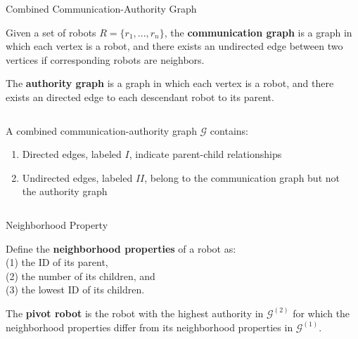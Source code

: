 \documentclass[10pt]{beamer}
\newcommand{\G}{\mathcal{G}}
\newcommand{\one}{^{(1)}}
\newcommand{\two}{^{(2)}}
\begin{document}
\begin{frame}{Combined Communication-Authority Graph}
  \begin{definition}
    \small{Given a set of robots $R =\{r_1, ..., r_n\}$, the \textbf{communication
        graph} is a graph in which each vertex is a robot, and there exists an
      undirected edge between two vertices if corresponding robots are
      neighbors.}
  \end{definition}
  \begin{definition}
    \small{The \textbf{authority graph} is a graph in which each vertex is a
      robot, and there exists an directed edge to each descendant robot to its
      parent.}
  \end{definition}
  \begin{columns}
    \begin{column}{0.5\textwidth}
      \small{A combined communication-authority graph $\G$ contains:
        \begin{enumerate}
        \item Directed edges, labeled $I$, indicate parent-child relationships
        \item Undirected edges, labeled $II$, belong to the communication graph
          but not the authority graph
        \end{enumerate}
      }
    \end{column}
    \begin{column}{0.4\textwidth}
      
    \end{column}
  \end{columns}
\end{frame}
\begin{frame}{Neighborhood Property}
  \begin{definition}
    \small{Define the \textbf{neighborhood properties} of a robot as:\\
      (1) the ID of its parent,\\
      (2) the number of its children, and\\
      (3) the lowest ID of its children.}
  \end{definition}
  \begin{definition}
    \small {The \textbf{pivot robot} is the robot with the highest authority in
      $\G\two$ for which the neighborhood properties differ from its
      neighborhood properties in $\G\one$.}
  \end{definition}
    
\end{frame}
\end{document}
